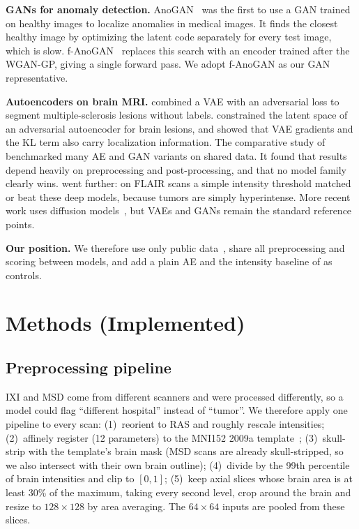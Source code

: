 \documentclass{article}
\begin{document}
\textbf{GANs for anomaly detection.} AnoGAN~\cite{schlegl2017anogan} was the first
to use a GAN trained on healthy images to localize anomalies in medical images.
It finds the closest healthy image by optimizing the latent code separately for
every test image, which is slow. f-AnoGAN~\cite{schlegl2019fanogan} replaces this
search with an encoder trained after the WGAN-GP, giving a single forward pass.
We adopt f-AnoGAN as our GAN representative.

\textbf{Autoencoders on brain MRI.} \citet{baur2018deep} combined a VAE with an
adversarial loss to segment multiple-sclerosis lesions without labels.
\citet{chen2018constrained} constrained the latent space of an adversarial
autoencoder for brain lesions, and \citet{zimmerer2019localization} showed that
VAE gradients and the KL term also carry localization information. The
comparative study of \citet{baur2021comparative} benchmarked many AE and GAN
variants on shared data. It found that results depend heavily on preprocessing
and post-processing, and that no model family clearly wins.
\citet{meissen2021challenging} went further: on FLAIR scans a simple intensity
threshold matched or beat these deep models, because tumors are simply
hyperintense. More recent work uses diffusion models~\cite{pinaya2022diffusion},
but VAEs and GANs remain the standard reference points.

\textbf{Our position.} We therefore use only public data~\cite{ixi,antonelli2022msd,menze2015brats},
share all preprocessing and scoring between models, and add a plain AE and the
intensity baseline of \citet{meissen2021challenging} as controls.

\section{Methods (Implemented)}

\subsection{Preprocessing pipeline}
\label{sec:preproc}

IXI and MSD come from different scanners and were processed differently, so a
model could flag ``different hospital'' instead of ``tumor''. We therefore apply
one pipeline to every scan:
(1)~reorient to RAS and roughly rescale intensities;
(2)~affinely register (12 parameters) to the MNI152 2009a template~\cite{fonov2011mni};
(3)~skull-strip with the template's brain mask (MSD scans are already
skull-stripped, so we also intersect with their own brain outline);
(4)~divide by the 99th percentile of brain intensities and clip to $[0,1]$;
(5)~keep axial slices whose brain area is at least 30\% of the maximum, taking
every second level, crop around the brain and resize to $128\times128$ by area
averaging. The $64\times64$ inputs are pooled from these slices.
\end{document}
